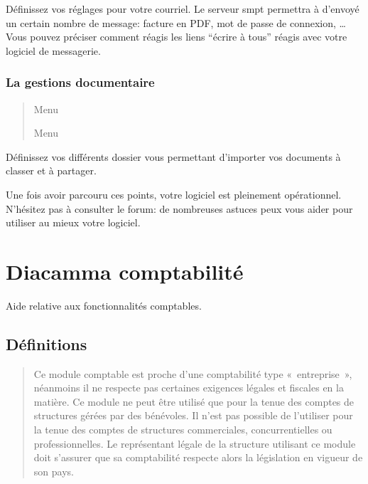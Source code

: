 \documentclass[a4paper,10pt,oneside,french]{sphinxmanual}
\begin{document}
Définissez vos réglages pour votre courriel.
Le serveur smpt permettra à  d’envoyé un certain nombre de message: facture en PDF, mot de passe de connexion, …
Vous pouvez préciser comment réagis les liens “écrire à tous” réagis avec votre logiciel de messagerie.


\subsection{La gestions documentaire}
\label{\detokenize{pro/first_step:la-gestions-documentaire}}\begin{quote}

Menu 

Menu 
\end{quote}

Définissez vos différents dossier vous permettant d’importer vos documents à classer et à partager.

Une fois avoir parcouru ces points, votre logiciel  est pleinement opérationnel.
N’hésitez pas à consulter le forum: de nombreuses astuces peux vous aider pour utiliser au mieux votre logiciel.


\chapter{Diacamma comptabilité}
\label{\detokenize{accounting/index:diacamma-comptabilite}}\label{\detokenize{accounting/index::doc}}
Aide relative aux fonctionnalités comptables.


\section{Définitions}
\label{\detokenize{accounting/definition:definitions}}\label{\detokenize{accounting/definition::doc}}\begin{quote}

 Ce module comptable est proche d’une comptabilité type « entreprise », néanmoins il ne respecte pas certaines exigences légales et fiscales en la matière.
Ce module ne peut être utilisé que pour la tenue des comptes de structures gérées par des bénévoles. Il n’est pas possible de l’utiliser pour la tenue des comptes de structures commerciales, concurrentielles ou professionnelles.
Le représentant légale de la structure utilisant ce module doit s’assurer que sa comptabilité respecte alors la législation en vigueur de son pays.
\end{quote}
\end{document}
